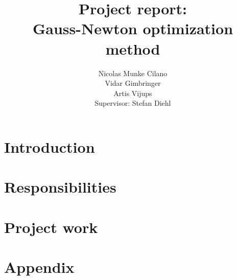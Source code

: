 \documentclass[12pt, a4paper]{article}
\title{Project report:
\\ Gauss-Newton optimization method}
\author{Nicolas Munke Cilano
\\ Vidar Gimbringer 
\\ Artis Vijups 
\vspace{10px} \\ Supervisor: Stefan Diehl}
\begin{document}
\maketitle

\section{Introduction}


\section{Responsibilities}


\section{Project work}


\section*{Appendix}

\end{document}
